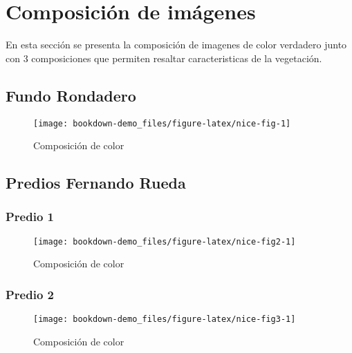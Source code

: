 \documentclass[]{report}
\begin{document}
\chapter{Composición de imágenes}\label{compoIma}

En esta sección se presenta la composición de imagenes de color
verdadero junto con 3 composiciones que permiten resaltar
caracteristicas de la vegetación.

\section{Fundo Rondadero}\label{fundo-rondadero}

\begin{figure}

{\centering \texttt{[image: bookdown-demo\_files/figure-latex/nice-fig-1]} 

}

\caption[one plot]{Composición de color}\label{fig:nice-fig}
\end{figure}

\section{Predios Fernando Rueda}\label{predios-fernando-rueda}

\subsection{Predio 1}\label{predio-1}

\begin{figure}

{\centering \texttt{[image: bookdown-demo\_files/figure-latex/nice-fig2-1]} 

}

\caption[one plot]{Composición de color}\label{fig:nice-fig2}
\end{figure}

\subsection{Predio 2}\label{predio-2}

\begin{figure}

{\centering \texttt{[image: bookdown-demo\_files/figure-latex/nice-fig3-1]} 

}

\caption[one plot]{Composición de color}\label{fig:nice-fig3}
\end{figure}
\end{document}
